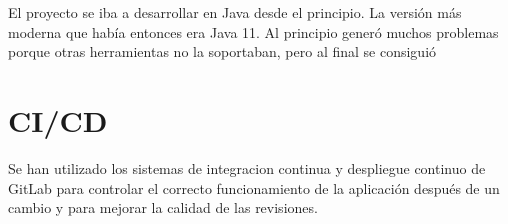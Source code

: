 El proyecto se iba a desarrollar en Java desde el principio. La versión más moderna que había entonces era Java 11. Al principio generó muchos problemas porque otras herramientas no la soportaban, pero al final se consiguió 
\section{CI/CD}
Se han utilizado los sistemas de integracion continua y despliegue continuo de GitLab para controlar el correcto funcionamiento de la aplicación después de un cambio y para mejorar la calidad de las revisiones.
